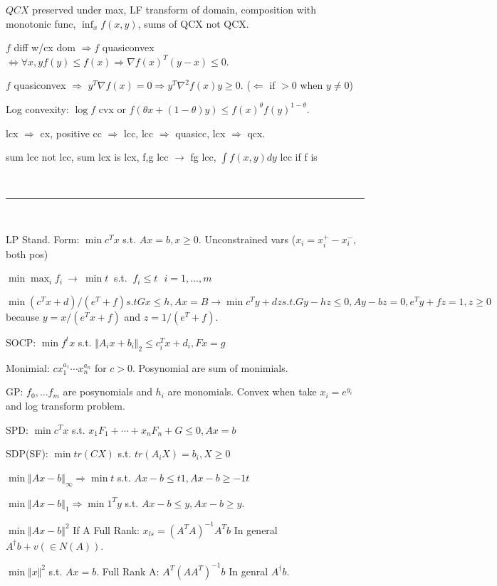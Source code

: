 \documentclass[10pt,twocolumn]{report}
\begin{document}
$QCX$ preserved under max, LF transform of domain, composition with monotonic func, $\inf_x f(x,y)$, sums of QCX not QCX.

$f$ diff w/cx dom $\Rightarrow f$ quasiconvex $\iff \forall x,y f(y) \le f(x) \Rightarrow \nabla f(x)^T(y - x) \le 0$.

$f$ quasiconvex $\Rightarrow$ $y^T\nabla f(x) = 0 \Rightarrow y^T\nabla^2 f(x) y \ge 0$. ($\Leftarrow$ if $> 0$ when $y \ne 0$)

Log convexity: $\log f$ cvx or $f(\theta x +(1-\theta)y) \le f(x)^\theta f(y)^{1-\theta}$.

lcx $\Rightarrow$ cx, positive cc $\Rightarrow$ lcc, lcc $\Rightarrow$ quasicc, lcx $\Rightarrow$ qcx.

sum lcc not lcc, sum lcx is lcx, f,g lcc $\rightarrow$ fg lcc, $\int f(x,y) dy$ lcc if f is

~

\hrule

~

LP Stand. Form: $\min c^Tx$ s.t. $Ax = b, x \ge 0$. Unconstrained vars ($x_i = x_i^+ - x_i^-$, both pos)

$\min \max_i f_i ~\rightarrow~ \min t~$ s.t. $~f_i \le t ~~~ i=1,...,m$ 

$\min (c^Tx + d)/(e^T + f) s.t Gx \le h, Ax = B \rightarrow \min c^Ty + dz s.t. Gy - hz \le 0, Ay-bz = 0, e^Ty + fz = 1, z \ge 0$ because $y=x/(e^Tx + f)$ and $z = 1/(e^T+ f)$.

SOCP: $\min f^tx $ s.t. $\Vert A_ix + b_i\Vert_2 \le c_i^Tx + d_i, Fx=g$

Monimial: $cx_1^{a_1}\cdots x_n^{a_n}$ for $c > 0$. Posynomial are sum of monimials.

GP: $f_0,...f_m$ are posynomials and $h_i$ are monomials. Convex when take $x_i = e^{y_i}$ and log transform problem.

SPD: $\min c^Tx $ s.t. $x_1F_1 + \cdots + x_nF_n + G \le 0, Ax = b$

SDP(SF): $\min tr(CX)$ s.t. $tr(A_iX)=b_i, X \ge 0$ 

$\min \Vert Ax - b \Vert_\infty \Rightarrow \min t$ s.t. $Ax - b \le t1, Ax-b\ge -1t$

$\min \Vert Ax - b \Vert_1 \Rightarrow \min 1^Ty$ s.t. $Ax - b \le y, Ax - b \ge y$.

$\min \Vert Ax - b \Vert^2$ If A Full Rank: $x_{ls} = (A^TA)^{-1}A^Tb$ In general $A^{\dagger}b+v(\in N(A))$.

$\min \Vert x \Vert ^2$ s.t. $Ax = b$. Full Rank A: $A^T(AA^T)^{-1}b$ In genral $A^{\dagger}b$.
\end{document}
